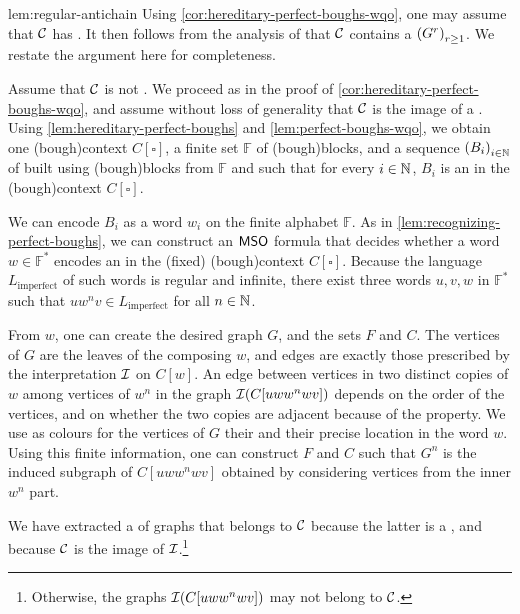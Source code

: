 \begin{proofof}{lem:regular-antichain}
  Using 
  \cref{cor:hereditary-perfect-boughs-wqo}, one may assume that $\Cls$
  has . It then follows from
  the analysis of \cite{LOPEZ24} that 
  $\Cls$ contains a  $\seqof{G^r}[r \geq 1]$.
  We restate the argument here for completeness.

  Assume that $\Cls$ is not . We proceed as
  in the proof of \cref{cor:hereditary-perfect-boughs-wqo},
  and assume without loss of generality that $\Cls$ is the image of 
  a .
  Using \cref{lem:hereditary-perfect-boughs} and \cref{lem:perfect-boughs-wqo},
  we obtain one \kl(bough){context} $C[\square]$, a finite set $\mathbb{F}$ of
  \kl(bough){blocks}, and a sequence $\seqof{B_i}[i \in \Nat]$ of 
  built using \kl(bough){blocks} from $\mathbb{F}$ and such that for every $i
  \in \mathbb{N}$, $B_i$ is an  in the \kl(bough){context}
  $C[\square]$. 

  We can encode $B_i$ as a word $w_i$ on the finite alphabet $\mathbb{F}$.
  As in \cref{lem:recognizing-perfect-boughs}, we can construct an
  $\mathsf{MSO}$ formula that decides whether a word $w \in \mathbb{F}^*$ encodes an
   in the (fixed) \kl(bough){context} $C[\square]$. Because
  the language $L_\text{imperfect}$ of such words is regular and infinite,
  there exist three words $u,v,w$ in $\mathbb{F}^*$ such that $u w^n v \in
  L_\text{imperfect}$ for all $n \in \mathbb{N}$.

  From $w$, one can create the desired graph $G$, and the sets $F$ and $C$. The
  vertices of $G$ are the leaves of the  composing $w$, and
  edges are exactly those prescribed by the interpretation $\mathcal{I}$ on
  $C[w]$. An edge between vertices in two distinct copies of $w$ among vertices
  of $w^n$ in the graph $\mathcal{I}(C[uw w^n wv])$ depends on
  the order of the vertices, and on whether the two copies are adjacent
  because of the  property. We use as colours for the
  vertices of $G$ their  and their precise location in the word
  $w$. Using this finite information, one can construct $F$ and $C$ such that
  $G^n$ is the induced subgraph of $C[u w w^n w v]$ obtained by considering
  vertices from the inner $w^n$ part.

  We have extracted a  of graphs that belongs to $\Cls$
  because the latter is a , and because $\Cls$ is the 
  image of $\mathcal{I}$.\footnote{Otherwise, the graphs $\mathcal{I}(C[u w w^n w v])$
  may not belong to $\Cls$.}


\end{proofof}
